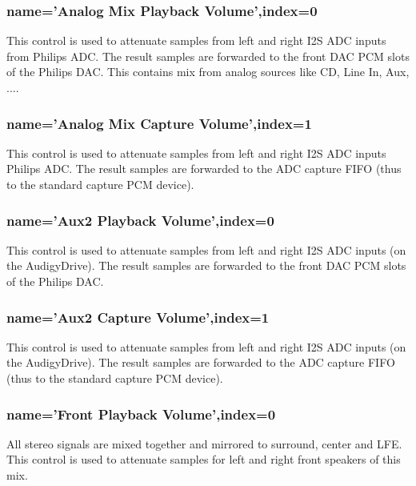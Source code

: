 \documentclass[a4paper,8pt,english]{sphinxmanual}
\begin{document}
\subsubsection{name='Analog Mix Playback Volume',index=0}
\label{sound/cards/audigy-mixer:name-analog-mix-playback-volume-index-0}
This control is used to attenuate samples from left and right I2S ADC
inputs from Philips ADC. The result samples are forwarded to the front
DAC PCM slots of the Philips DAC. This contains mix from analog sources
like CD, Line In, Aux, ....


\subsubsection{name='Analog Mix Capture Volume',index=1}
\label{sound/cards/audigy-mixer:name-analog-mix-capture-volume-index-1}
This control is used to attenuate samples from left and right I2S ADC
inputs Philips ADC. The result samples are forwarded to the ADC
capture FIFO (thus to the standard capture PCM device).


\subsubsection{name='Aux2 Playback Volume',index=0}
\label{sound/cards/audigy-mixer:name-aux2-playback-volume-index-0}
This control is used to attenuate samples from left and right I2S ADC
inputs (on the AudigyDrive). The result samples are forwarded to the front
DAC PCM slots of the Philips DAC.


\subsubsection{name='Aux2 Capture Volume',index=1}
\label{sound/cards/audigy-mixer:name-aux2-capture-volume-index-1}
This control is used to attenuate samples from left and right I2S ADC
inputs (on the AudigyDrive). The result samples are forwarded to the ADC
capture FIFO (thus to the standard capture PCM device).


\subsubsection{name='Front Playback Volume',index=0}
\label{sound/cards/audigy-mixer:name-front-playback-volume-index-0}
All stereo signals are mixed together and mirrored to surround, center and LFE.
This control is used to attenuate samples for left and right front speakers of
this mix.
\end{document}
